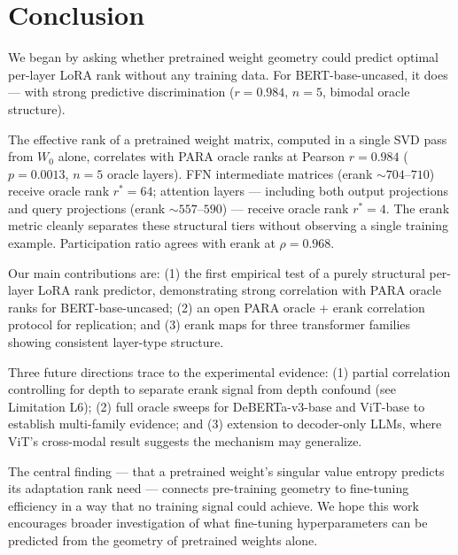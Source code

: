 \section{Conclusion}
\label{sec:conclusion}

We began by asking whether pretrained weight geometry could predict optimal per-layer LoRA rank without any training data. For BERT-base-uncased, it does --- with strong predictive discrimination ($r = 0.984$, $n=5$, bimodal oracle structure).

The effective rank of a pretrained weight matrix, computed in a single SVD pass from $W_0$ alone, correlates with PARA oracle ranks at Pearson $r = 0.984$ ($p = 0.0013$, $n=5$ oracle layers). FFN intermediate matrices (erank $\sim 704$--$710$) receive oracle rank $r^* = 64$; attention layers --- including both output projections and query projections (erank $\sim 557$--$590$) --- receive oracle rank $r^* = 4$. The erank metric cleanly separates these structural tiers without observing a single training example. Participation ratio agrees with erank at $\rho = 0.968$.

Our main contributions are: (1) the first empirical test of a purely structural per-layer LoRA rank predictor, demonstrating strong correlation with PARA oracle ranks for BERT-base-uncased; (2) an open PARA oracle + erank correlation protocol for replication; and (3) erank maps for three transformer families showing consistent layer-type structure.

Three future directions trace to the experimental evidence: (1) partial correlation controlling for depth to separate erank signal from depth confound (see Limitation L6); (2) full oracle sweeps for DeBERTa-v3-base and ViT-base to establish multi-family evidence; and (3) extension to decoder-only LLMs, where ViT's cross-modal result suggests the mechanism may generalize.

The central finding --- that a pretrained weight's singular value entropy predicts its adaptation rank need --- connects pre-training geometry to fine-tuning efficiency in a way that no training signal could achieve. We hope this work encourages broader investigation of what fine-tuning hyperparameters can be predicted from the geometry of pretrained weights alone.
